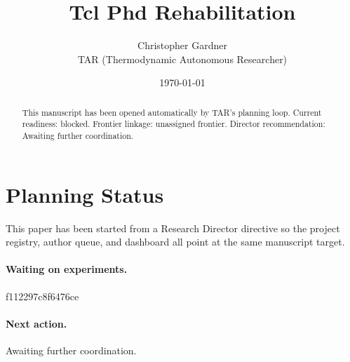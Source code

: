 \documentclass[11pt]{article}
\title{Tcl Phd Rehabilitation}
\author{Christopher Gardner \\ TAR (Thermodynamic Autonomous Researcher)}
\date{\today}
\begin{document}
\maketitle

\begin{abstract}
This manuscript has been opened automatically by TAR's planning loop.
Current readiness: blocked. Frontier linkage: unassigned frontier.
Director recommendation: Awaiting further coordination.
\end{abstract}

\section{Planning Status}
This paper has been started from a Research Director directive so the project registry,
author queue, and dashboard all point at the same manuscript target.

\paragraph{Waiting on experiments.}
f112297c8f6476ce

\paragraph{Next action.}
Awaiting further coordination.
\end{document}
